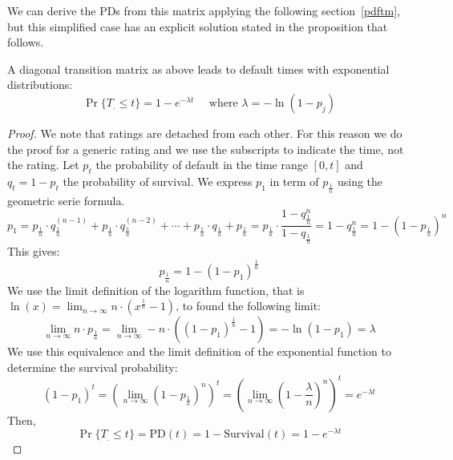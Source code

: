 \documentclass[11pt,fleqn]{book} %
\begin{document}
We can derive the PDs from this matrix applying the following 
section~\ref{pdftm}, but this simplified case has an explicit
solution stated in the proposition that follows.

\begin{proposition}
	A diagonal transition matrix as above leads to default times with 
	exponential distributions:
	\begin{displaymath}
		\Pr\{T_. \le t\} = 1 - e^{-\lambda t} 
		\quad \text{ where } \lambda = -\ln(1-p_j)
	\end{displaymath}
\end{proposition}
\begin{proof}
	We note that ratings are detached from each other. 
	For this reason we do the proof for a generic rating and we
	use the subscripts to indicate the time, not the rating.
	Let $p_t$ the probability of default in the time range $[0,t]$ and
	$q_t=1-p_t$ the probability of survival. We express $p_1$ in term
	of $p_{\frac{1}{n}}$ using the geometric serie formula.
	\begin{displaymath}
		p_1 = p_{\frac{1}{n}} \cdot q_{\frac{1}{n}}^{(n-1)} + 
			p_{\frac{1}{n}} \cdot q_{\frac{1}{n}}^{(n-2)} + \cdots + 
			p_{\frac{1}{n}} \cdot q_{\frac{1}{n}} + 
			p_{\frac{1}{n}}
		= p_{\frac{1}{n}} \cdot \frac{1-q_{\frac{1}{n}}^n}{1-q_{\frac{1}{n}}}
		= 1 - q_{\frac{1}{n}}^n
		= 1- (1-p_{\frac{1}{n}})^n
	\end{displaymath}
	This gives:
	\begin{displaymath}
		p_{\frac{1}{n}} = 1-(1-p_1)^{\frac{1}{n}}
	\end{displaymath}
	We use the limit definition of the logarithm function, that is 
	$\ln(x)=\lim_{n \to \infty} n \cdot(x^{\frac{1}{n}}-1)$, to
	found the following limit:
	\begin{displaymath}
		\lim_{n \to \infty} n \cdot p_{\frac{1}{n}} = 
		\lim_{n \to \infty} -n \cdot ((1-p_1)^{\frac{1}{n}} -1) =
		-\ln(1-p_1) = \lambda
	\end{displaymath}
	We use this equivalence and the limit definition of the 
	exponential function to determine the survival probability:
	\begin{displaymath}
		(1-p_1)^t 
		= \left( \lim_{n \to \infty} (1-p_{\frac{1}{n}})^n \right)^t
		= \left(\lim_{n \to \infty} (1-\frac{\lambda}{n})^n \right)^t
		= e^{-\lambda t}
	\end{displaymath}
	Then,
	\begin{displaymath}
		\Pr\{T_. \le t\} = \text{PD}(t) = 
		1 - \text{Survival}(t) = 1 - e^{-\lambda t}
	\end{displaymath}
\end{proof}
\end{document}
